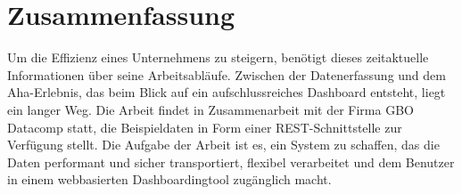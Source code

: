 \chapter*{Zusammenfassung}
\label{chap:zusammenfassung}

Um die Effizienz eines Unternehmens zu steigern, benötigt dieses zeitaktuelle Informationen über seine Arbeitsabläufe.
Zwischen der Datenerfassung und dem Aha-Erlebnis, das beim Blick auf ein aufschlussreiches Dashboard entsteht, liegt ein
langer Weg. Die Arbeit findet in Zusammenarbeit mit der Firma GBO Datacomp statt, die Beispieldaten
in Form einer REST-Schnittstelle zur Verfügung stellt. Die Aufgabe der Arbeit ist es, ein System zu schaffen,
das die Daten performant und sicher transportiert, flexibel verarbeitet und dem Benutzer
in einem webbasierten Dashboardingtool zugänglich macht.


